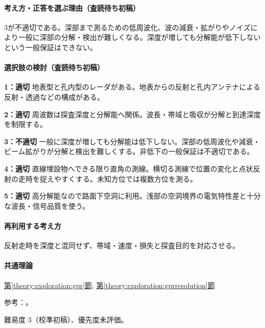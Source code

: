 \paragraph{考え方・正答を選ぶ理由（査読待ち初稿）} 3が不適切である。深部まで測るための低周波化、波の減衰・拡がりやノイズにより一般に深部の分解・検出が難しくなる。深度が増しても分解能が低下しないという一般保証はできない。

\paragraph{選択肢の検討（査読待ち初稿）}\mbox{}\par

\noindent\textbf{1：適切} 地表型と孔内型のレーダがある。地表からの反射と孔内アンテナによる反射・透過などの構成がある。\par

\noindent\textbf{2：適切} 周波数は探査深度と分解能へ関係。波長・帯域と吸収が分解と到達深度を制限する。\par

\noindent\textbf{3：不適切} 一般に深度が増しても分解能は低下しない。深部の低周波化や減衰・ビーム拡がりが分解と検出を難しくする。非低下の一般保証は不適切である。\par

\noindent\textbf{4：適切} 直線埋設物へできる限り直角の測線。横切る測線で位置の変化と点状反射の走時を捉えやすくする。未知方位では複数方位を測る。\par

\noindent\textbf{5：適切} 高分解能なので路面下空洞に利用。浅部の空洞境界の電気特性差と十分な波長・信号品質を使う。\par

\paragraph{再利用する考え方} 反射走時を深度と混同せず、帯域・速度・損失と探査目的を対応させる。

\paragraph{共通理論} \hyperref[theory:exploration:gpr]{第\ref*{theory:exploration:gpr}節}, \hyperref[theory:exploration:gprresolution]{第\ref*{theory:exploration:gprresolution}節}

\par 参考：\cite{epa_gpr}。

\par 難易度 3（校準初稿）、優先度未評価。

